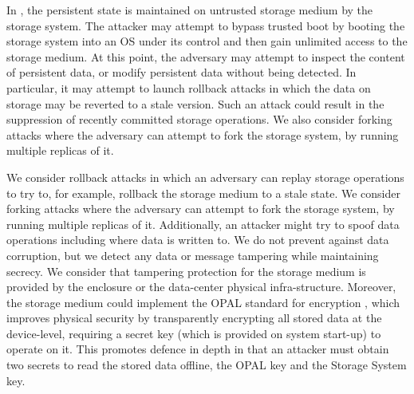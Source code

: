 

 In \project{}, the persistent state is maintained on untrusted storage medium by the storage system. %
The attacker may attempt to bypass trusted boot by booting the storage system into an OS under its control and then gain unlimited access to the storage medium. At this point, the adversary may attempt to inspect the content of persistent data, or modify persistent data without being detected. In particular, it may attempt to launch rollback attacks in which the data on storage may be reverted to a stale version. Such an attack could result in the suppression of recently committed storage operations. We also consider forking attacks where the adversary can attempt to fork the storage system, by running multiple replicas of it.

We consider rollback attacks in which an adversary can replay storage operations to try to, for example, rollback the storage medium to a stale state.
We consider forking attacks where the adversary can attempt to fork the storage system, by running multiple replicas of it. Additionally, an attacker might try to spoof data operations including where data is written to. We do not prevent against data corruption, but we detect any data or message tampering while maintaining secrecy. We consider that tampering protection for the storage medium is provided by the enclosure or the data-center physical infra-structure. Moreover, the storage medium could implement the OPAL standard for encryption \cite{opal}, which improves physical security by transparently encrypting all stored data at the device-level, requiring a secret key (which is provided on system start-up) to operate on it. This promotes defence in depth in that an attacker must obtain two secrets to read the stored data offline, the OPAL key and the Storage System key.
\fi

